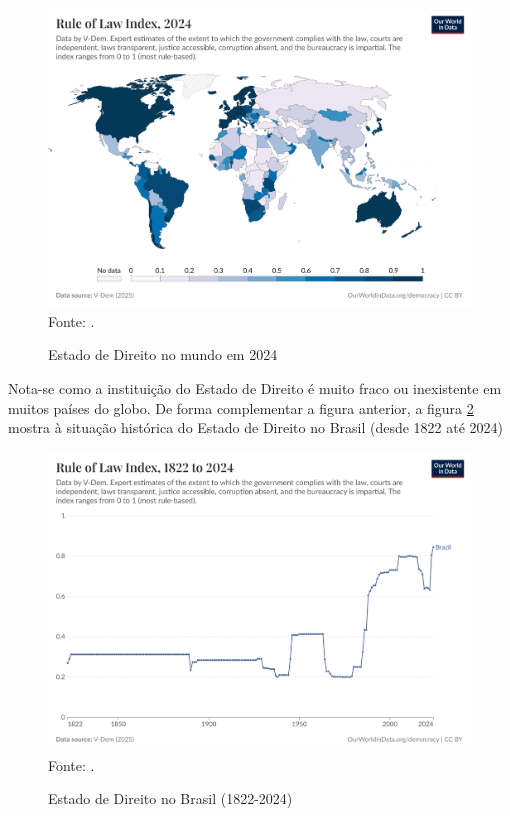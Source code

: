 \begin{figure}[H]
	\centering
	\caption{Estado de Direito no mundo em 2024}
	\includegraphics[width=1\linewidth]{figuras/rule-of-law-index.png}
	\label{fig:rule-of-law-index}
	\footnotesize{Fonte: \cite{rule-of-law-index}.}
\end{figure}

Nota-se como a instituição do Estado de Direito é muito fraco ou inexistente em muitos países do globo. De forma complementar a figura anterior, a figura \ref{fig:rule-of-law-index-brazil} mostra à situação histórica do Estado de Direito no Brasil (desde 1822 até 2024)

\begin{figure}[H]
	\centering
	\caption{Estado de Direito no Brasil (1822-2024)}
	\includegraphics[width=1\linewidth]{figuras/rule-of-law-index-brazil.png}
	\label{fig:rule-of-law-index-brazil}
	\footnotesize{Fonte: \cite{rule-of-law-index}.}
\end{figure}


